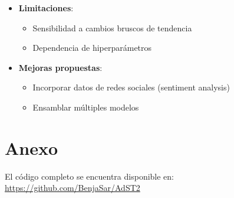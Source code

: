 \documentclass[12pt]{article}
\begin{document}
\begin{itemize}
\item \textbf{Limitaciones}:
\begin{itemize}
\item Sensibilidad a cambios bruscos de tendencia
\item Dependencia de hiperparámetros
\end{itemize}

\item \textbf{Mejoras propuestas}:
\begin{itemize}
\item Incorporar datos de redes sociales (sentiment analysis)
\item Ensamblar múltiples modelos
\end{itemize}
\end{itemize}


\newpage
\section*{Anexo}
El código completo se encuentra disponible en: \\
\url{https://github.com/BenjaSar/AdST2}
\end{document}
